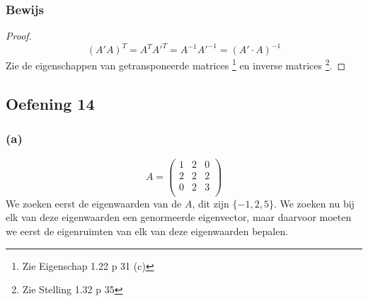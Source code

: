 \documentclass[lineaire_algebra_oplossingen.tex]{subfiles}
\begin{document}
\subsubsection*{Bewijs}
\begin{proof}
\[
(A'A)^T = A^TA'^T = A^{-1}A'^{-1} = (A'\cdot A)^{-1} 
\]
Zie de eigenschappen van getransponeerde matrices \footnote{Zie Eigenschap 1.22 p 31 (c)} en inverse matrices \footnote{Zie Stelling 1.32 p 35}.
\end{proof}


\subsection{Oefening 14}
\subsubsection*{(a)}
\[
A = 
\begin{pmatrix}
1 & 2 & 0\\
2 & 2 & 2\\
0 & 2 & 3\\
\end{pmatrix}
\]
We zoeken eerst de eigenwaarden van de $A$, dit zijn $\{-1,2,5\}$.
We zoeken nu bij elk van deze eigenwaarden een genormeerde eigenvector, maar daarvoor moeten we eerst de eigenruimten van elk van deze eigenwaarden bepalen.
\end{document}
